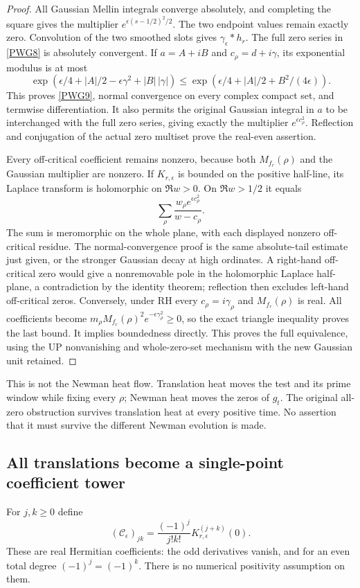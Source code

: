 \begin{proof}
All Gaussian Mellin integrals converge absolutely, and completing the square gives the multiplier $e^{\epsilon(s-1/2)^2/2}$. The two endpoint values remain exactly zero. Convolution of the two smoothed slots gives $\gamma_\epsilon*h_r$. The full zero series in \eqref{PWG8} is absolutely convergent. If $a=A+iB$ and $c_\rho=d+i\gamma$, its exponential modulus is at most
\[
 \exp(\epsilon/4+|A|/2-\epsilon\gamma^2+|B|\,|\gamma|)
 \le\exp(\epsilon/4+|A|/2+B^2/(4\epsilon)).
\]
This proves \eqref{PWG9}, normal convergence on every complex compact set, and termwise differentiation. It also permits the original Gaussian integral in $a$ to be interchanged with the full zero series, giving exactly the multiplier $e^{\epsilon c_\rho^2}$. Reflection and conjugation of the actual zero multiset prove the real-even assertion.

Every off-critical coefficient remains nonzero, because both $M_{f_r}(\rho)$ and the Gaussian multiplier are nonzero. If $K_{r,\epsilon}$ is bounded on the positive half-line, its Laplace transform is holomorphic on $\Re w>0$. On $\Re w>1/2$ it equals
\[
 \sum_\rho\frac{w_\rho e^{\epsilon c_\rho^2}}{w-c_\rho}.
\]
The sum is meromorphic on the whole plane, with each displayed nonzero off-critical residue. The normal-convergence proof is the same absolute-tail estimate just given, or the stronger Gaussian decay at high ordinates. A right-hand off-critical zero would give a nonremovable pole in the holomorphic Laplace half-plane, a contradiction by the identity theorem; reflection then excludes left-hand off-critical zeros. Conversely, under RH every $c_\rho=i\gamma_\rho$ and $M_{f_r}(\rho)$ is real. All coefficients become $m_\rho M_{f_r}(\rho)^2e^{-\epsilon\gamma_\rho^2}\ge0$, so the exact triangle inequality proves the last bound. It implies boundedness directly. This proves the full equivalence, using the UP nonvanishing and whole-zero-set mechanism with the new Gaussian unit retained.
\end{proof}

This is not the Newman heat flow. Translation heat moves the test and its prime window while fixing every $\rho$; Newman heat moves the zeros of $g_t$. The original all-zero obstruction survives translation heat at every positive time. No assertion that it must survive the different Newman evolution is made.

\subsection{All translations become a single-point coefficient tower}
For $j,k\ge0$ define
\begin{equation}
 (\mathcal C_\epsilon)_{jk}
   =\frac{(-1)^j}{j!k!}K_{r,\epsilon}^{(j+k)}(0).
                                                               \tag{PWG11}\label{PWG11}
\end{equation}
These are real Hermitian coefficients: the odd derivatives vanish, and for an even total degree $(-1)^j=(-1)^k$. There is no numerical positivity assumption on them.


